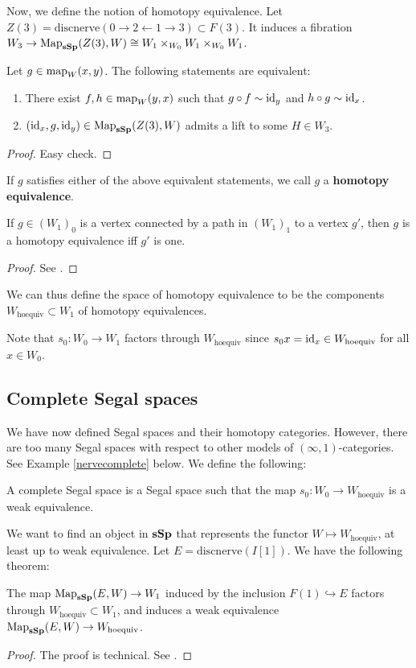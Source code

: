\begin{refsection}
Now, we define the notion of homotopy equivalence. Let $Z(3)=\mathrm{discnerve}(0\to2\leftarrow1\to3)\subset F(3)$. It induces a fibration $W_3\to\operatorname{\mathrm{Map}}_{\mathbf{sSp}}(Z(3),W)\cong W_1\times_{W_0}W_1\times_{W_0}W_1$.

\begin{prop}
Let $g\in\operatorname{\mathrm{map}}_W(x,y)$. The following statements are equivalent:
\begin{enumerate}
\item There exist $f,h\in\operatorname{\mathrm{map}}_W(y,x)$ such that $g\circ f\sim\mathrm{id}_y$ and $h\circ g\sim\mathrm{id}_x$.
\item $(\mathrm{id}_x,g,\mathrm{id}_y)\in\operatorname{\mathrm{Map}}_{\mathbf{sSp}}(Z(3),W)$ admits a lift to some $H\in W_3$.
\end{enumerate}
\end{prop}
\begin{proof}
Easy check.
\end{proof}

If $g$ satisfies either of the above equivalent statements, we call $g$ a \textbf{homotopy equivalence}.

\begin{lemma}
If $g\in (W_1)_0$ is a vertex connected by a path in $(W_1)_1$ to a vertex $g'$, then $g$ is a homotopy equivalence iff $g'$ is one.
\end{lemma}
\begin{proof}
See \cite[Lemma 5.8]{rezk}.
\end{proof}

\begin{defin}
We can thus define the space of homotopy equivalence to be the components $W_{\mathrm{hoequiv}}\subset W_1$ of homotopy equivalences.
\end{defin}
Note that $s_0:W_0\to W_1$ factors through $W_{\mathrm{hoequiv}}$ since $s_0x=\mathrm{id}_x\in W_{\mathrm{hoequiv}}$ for all $x\in W_0$.

\subsection{Complete Segal spaces}
We have now defined Segal spaces and their homotopy categories. However, there are too many Segal spaces with respect to other models of $(\infty,1)$-categories. See Example \ref{nervecomplete} below.
We define the following:
\begin{defin}
A complete Segal space is a Segal space such that the map $s_0:W_0\to W_{\mathrm{hoequiv}}$ is a weak equivalence.
\end{defin}

We want to find an object in $\mathbf{sSp}$ that represents the functor $W\mapsto W_{\mathrm{hoequiv}}$, at least up to weak equivalence. Let $E=\mathrm{discnerve}(I[1])$. We have the following theorem:
\begin{thm}\label{rephoequiv}
The map $\operatorname{\mathrm{Map}}_{\mathbf{sSp}}(E,W)\to W_1$ induced by the inclusion $F(1)\hookrightarrow E$ factors through $W_{\mathrm{hoequiv}}\subset W_1$, and induces a weak equivalence $\operatorname{\mathrm{Map}}_{\mathbf{sSp}}(E,W)\to W_{\mathrm{hoequiv}}$.
\end{thm}
\begin{proof}
The proof is technical. See \cite[Thm 6.2]{rezk}.
\end{proof}


\end{refsection}
